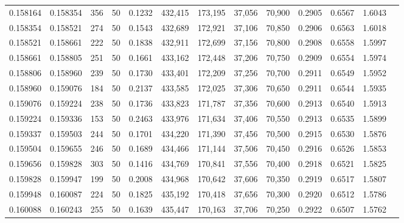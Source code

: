 \begin{tabular}{rrrrrrrrrrrrr}
0.158164 & 0.158354 &   356 &  50 &                                     0.1232 & 432,415 & 173,195 &  37,056 &  70,900 & 0.2905 & 0.6567 & 1.6043 \\
0.158354 & 0.158521 &   274 &  50 &                                     0.1543 & 432,689 & 172,921 &  37,106 &  70,850 & 0.2906 & 0.6563 & 1.6018 \\
0.158521 & 0.158661 &   222 &  50 &                                     0.1838 & 432,911 & 172,699 &  37,156 &  70,800 & 0.2908 & 0.6558 & 1.5997 \\
0.158661 & 0.158805 &   251 &  50 &                                     0.1661 & 433,162 & 172,448 &  37,206 &  70,750 & 0.2909 & 0.6554 & 1.5974 \\
0.158806 & 0.158960 &   239 &  50 &                                     0.1730 & 433,401 & 172,209 &  37,256 &  70,700 & 0.2911 & 0.6549 & 1.5952 \\
0.158960 & 0.159076 &   184 &  50 &                                     0.2137 & 433,585 & 172,025 &  37,306 &  70,650 & 0.2911 & 0.6544 & 1.5935 \\
0.159076 & 0.159224 &   238 &  50 &                                     0.1736 & 433,823 & 171,787 &  37,356 &  70,600 & 0.2913 & 0.6540 & 1.5913 \\
0.159224 & 0.159336 &   153 &  50 &                                     0.2463 & 433,976 & 171,634 &  37,406 &  70,550 & 0.2913 & 0.6535 & 1.5899 \\
0.159337 & 0.159503 &   244 &  50 &                                     0.1701 & 434,220 & 171,390 &  37,456 &  70,500 & 0.2915 & 0.6530 & 1.5876 \\
0.159504 & 0.159655 &   246 &  50 &                                     0.1689 & 434,466 & 171,144 &  37,506 &  70,450 & 0.2916 & 0.6526 & 1.5853 \\
0.159656 & 0.159828 &   303 &  50 &                                     0.1416 & 434,769 & 170,841 &  37,556 &  70,400 & 0.2918 & 0.6521 & 1.5825 \\
0.159828 & 0.159947 &   199 &  50 &                                     0.2008 & 434,968 & 170,642 &  37,606 &  70,350 & 0.2919 & 0.6517 & 1.5807 \\
0.159948 & 0.160087 &   224 &  50 &                                     0.1825 & 435,192 & 170,418 &  37,656 &  70,300 & 0.2920 & 0.6512 & 1.5786 \\
0.160088 & 0.160243 &   255 &  50 &                                     0.1639 & 435,447 & 170,163 &  37,706 &  70,250 & 0.2922 & 0.6507 & 1.5762 \\

\end{tabular}
